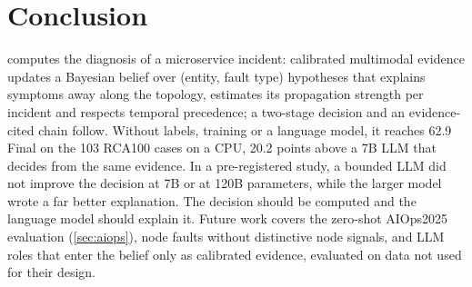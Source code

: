 \section{Conclusion}\label{sec:conclusion}

\gama{} computes the diagnosis of a microservice incident: calibrated multimodal evidence updates a Bayesian belief over (entity,
fault type) hypotheses that explains symptoms away along the topology, estimates its propagation strength per incident and respects
temporal precedence; a two-stage decision and an evidence-cited chain follow. Without labels, training or a language model, it
reaches 62.9 Final on the 103 RCA100 cases on a CPU, 20.2 points above a 7B LLM that decides from the same evidence. In a
pre-registered study, a bounded LLM did not improve the decision at 7B or at 120B parameters, while the larger model wrote a far
better explanation. The decision should be computed and the language model should explain it. Future work covers the zero-shot
AIOps2025 evaluation (\cref{sec:aiops}), node faults without distinctive node signals, and LLM roles that enter the belief only as
calibrated evidence, evaluated on data not used for their design.
